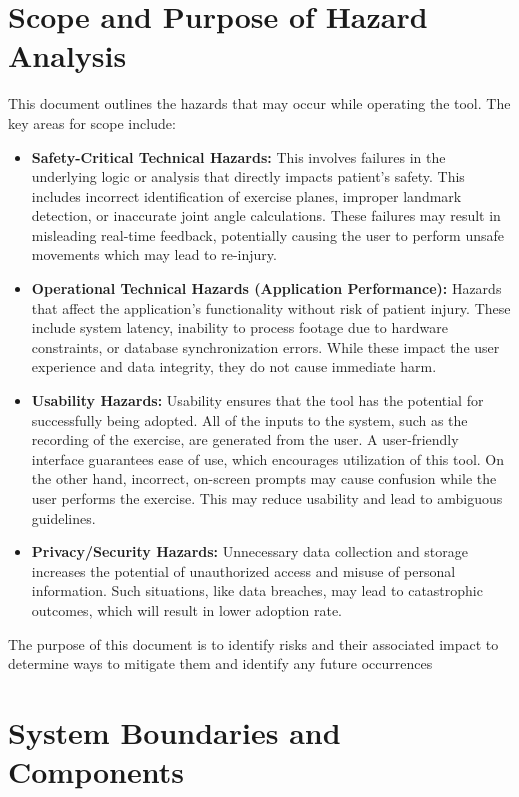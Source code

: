 \documentclass{article}
\begin{document}
\section{Scope and Purpose of Hazard Analysis}

This document outlines the hazards that may occur while operating the tool. The key areas for scope include:


\begin{itemize}
    \item \textbf{Safety-Critical Technical Hazards:} This involves failures in the underlying logic or  analysis that directly impacts patient's safety. This includes incorrect identification of exercise planes, improper landmark detection, or inaccurate joint angle calculations. These failures may result in misleading real-time feedback, potentially causing the user to perform unsafe movements which may lead to re-injury.
    \item \textbf{Operational Technical Hazards (Application Performance):} Hazards that affect the application's functionality without risk of patient injury. These include system latency, inability to process footage due to hardware constraints, or database synchronization errors. While these impact the user experience and data integrity, they do not cause immediate harm.
    \item \textbf{Usability Hazards:} Usability ensures that the tool has the potential for  successfully being adopted. All of the inputs to the system, such as the recording of the exercise, are generated from the user. A user-friendly interface guarantees ease of use, which encourages utilization of this tool. On the other hand, incorrect, on-screen prompts  may cause confusion  while the user performs the exercise. This may reduce usability and lead to ambiguous guidelines.
    \item \textbf{Privacy/Security Hazards:} Unnecessary data collection and storage increases the potential of unauthorized access and misuse of personal information. Such situations, like data breaches, may lead to catastrophic outcomes, which will result in lower adoption rate.
\end{itemize}


The purpose of this document is to identify risks and their associated impact to determine ways to mitigate them and identify any future occurrences 


\section{System Boundaries and Components}
\end{document}
